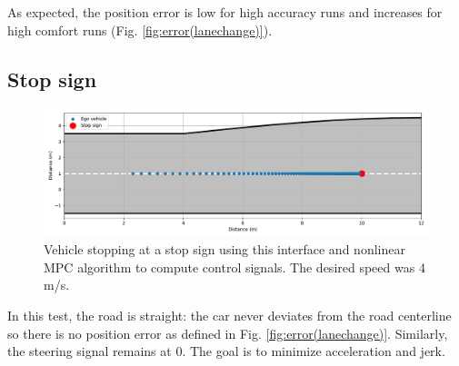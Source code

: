 \documentclass[letterpaper, 10 pt, conference]{ieeeconf}  %
\begin{document}
 As expected, the position error is low for high accuracy runs and increases for high comfort runs (Fig. \ref{fig:error(lanechange)}).
 
 \subsection{Stop sign}
 
 
\begin{figure}[h!]
	\centering
	\includegraphics[width=1.0\linewidth]{figures/stop_sign.pdf}
	\caption{Vehicle stopping at a stop sign using this interface and nonlinear MPC algorithm to compute control signals. The desired speed was 4 m/s.}
		\label{fig:stop_sign}
\end{figure}
 
% 
 In this test, the road is straight: the car never deviates from the road centerline so there is no position error as defined in Fig. \ref{fig:error(lanechange)}. Similarly, the steering signal remains at 0. The goal is to minimize acceleration and jerk.
 
\end{document}
